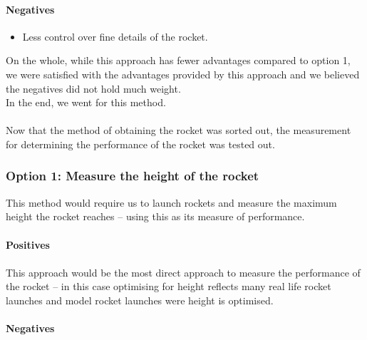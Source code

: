 \documentclass[14pt]{article}
\begin{document}
\paragraph{Negatives}
\begin{itemize}
    \item Less control over fine details of the rocket.
\end{itemize}
On the whole, while this approach has fewer advantages compared to option 1, we were satisfied with the advantages provided by this approach and we believed the negatives did not hold much weight. 
\\In the end, we went for this method.
\\\\
Now that the method of obtaining the rocket was sorted out, the measurement for determining the performance of the rocket was tested out.
\subsubsection{Option 1: Measure the height of the rocket}

This method would require us to launch rockets and measure the maximum height the rocket reaches -- using this as its measure of performance.
\paragraph{Positives}
\paragraph{}
This approach would be the most direct approach to measure the performance of the rocket --  in this case optimising for height reflects many real life rocket launches and model rocket launches were height is optimised.
\paragraph{Negatives}
\end{document}

